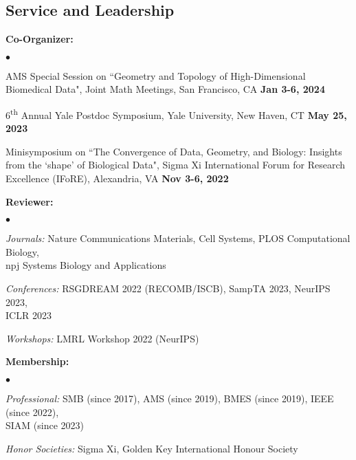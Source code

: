\documentclass[margin,line]{res}
\newenvironment{list1}{
  \begin{list}{\ding{113}}{
      \setlength{\itemsep}{0in}
      \setlength{\parsep}{0in} \setlength{\parskip}{0in}
      \setlength{\topsep}{0in} \setlength{\partopsep}{0in}
      \setlength{\leftmargin}{0.17in}}}{\end{list}}
\newenvironment{list2}{
  \begin{list}{$\bullet$}{
      \setlength{\itemsep}{0in}
      \setlength{\parsep}{0in} \setlength{\parskip}{0in}
      \setlength{\topsep}{0in} \setlength{\partopsep}{0in}
      \setlength{\leftmargin}{0.2in}}}{\end{list}}
\begin{document}
\begin{resume}
\section{\sc Service and Leadership}

\begin{list1}
\setlength\itemsep{0.5em}
\item[] {\bf Co-Organizer:}
\vspace*{.2cm}
  \begin{list2}
  \setlength\itemsep{0.5em}
  \item[] AMS Special Session on ``Geometry and Topology of High-Dimensional Biomedical Data", Joint Math Meetings, San Francisco, CA \hfill {\bf Jan 3-6, 2024}
  \item[] 6\textsuperscript{th} Annual Yale Postdoc Symposium, Yale University, New Haven, CT \hfill {\bf May 25, 2023}
  \item[] Minisymposium on ``The Convergence of Data, Geometry, and Biology: Insights from the `shape' of Biological Data", 
          Sigma Xi International Forum for Research Excellence (IFoRE), Alexandria, VA \hfill {\bf Nov 3-6, 2022}
  \end{list2}
\item[] {\bf Reviewer:}
\vspace*{.2cm}
  \begin{list2}
  \setlength\itemsep{0.5em}
  \item[] \textit{Journals:} Nature Communications Materials, Cell Systems, PLOS Computational Biology, \\ 
  \hspace*{4.3em} npj Systems Biology and Applications
  \item[] \textit{Conferences:} RSGDREAM 2022 (RECOMB/ISCB), SampTA 2023, NeurIPS 2023, \\
  \hspace*{5.7em} ICLR 2023
  \item[] \textit{Workshops:} LMRL Workshop 2022 (NeurIPS)
  \end{list2}
\item[] {\bf Membership:}
\vspace*{.2cm}
  \begin{list2}
  \setlength\itemsep{0.5em}
  \item[] \textit{Professional:} SMB (since 2017), AMS (since 2019), BMES (since 2019), IEEE (since 2022), \\ 
  \hspace*{5.7em} SIAM (since 2023)
  \item[] \textit{Honor Societies:} Sigma Xi, Golden Key International Honour Society
  \end{list2}
\end{list1}


\end{resume}
\end{document}
